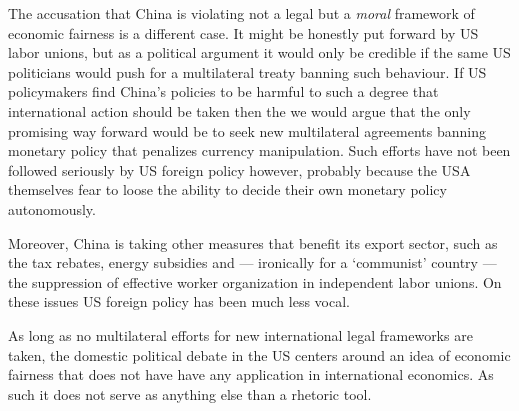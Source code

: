 The accusation that China is violating not a legal but a \emph{moral} framework of economic fairness is a different case. It might be honestly put forward by US labor unions, but as a political argument it would only be credible if the same US politicians would push for a multilateral treaty banning such behaviour. If US policymakers find China's policies to be harmful to such a degree that 
international action should be taken then the we would argue that the 
only promising way forward would be to seek new multilateral agreements 
banning monetary policy that penalizes currency manipulation. Such 
efforts have not been followed seriously by US foreign policy however, probably because the USA themselves fear to loose the ability to decide their own 
monetary policy autonomously. 

Moreover, China is taking other measures that benefit its export 
sector, such as the tax rebates, energy subsidies and --- ironically for 
a `communist' country --- the suppression of effective worker 
organization in independent labor unions. On these issues US foreign 
policy has been much less vocal.

As long as no multilateral efforts for new international legal frameworks are taken, the domestic political debate in the US centers around 
an idea of economic fairness that does not have have any application in 
international economics. As such it does not serve as anything else than 
a rhetoric tool.%




